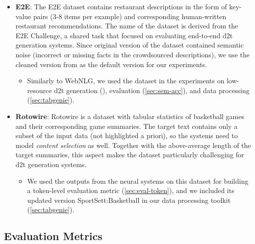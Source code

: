 {\begin{itemize}
    \item \textbf{E2E}: The E2E dataset \cite{dusekEvaluatingStateoftheartEndtoEnd2020} contains restaurant descriptions in the form of key-value pairs (3-8 items per example) and corresponding human-written restaurant recommendations. The name of the dataset is derived from the E2E Challenge, a shared task that focused on evaluating end-to-end \ac{d2t} generation systems. Since original version of the dataset contained semantic noise (incorrect or missing facts in the crowdsourced descriptions), we use the cleaned version from \citet{dusekSemanticNoiseMatters2019} as the default version for our experiments.
          \begin{itemize}
              \item
                    Similarly to WebNLG, we used the dataset in the experiments on low-resource \ac{d2t} generation (), evaluation (\autoref{sec:sem-acc}), and data processing (\autoref{sec:tabgenie}).
          \end{itemize}

    \item \textbf{Rotowire}: Rotowire \cite{wiseman2017challenges} is a dataset with tabular statistics of basketball games and their corresponding game summaries. The target text contains only a subset of the input data (not highlighted a priori), so the systems need to model \emph{content selection} as well. Together with the above-average length of the target summaries, this aspect makes the dataset particularly challenging for \ac{d2t} generation systems.
          \begin{itemize}
              \item
                    We used the outputs from the neural systems on this dataset for building a token-level evaluation metric (\autoref{sec:eval-token}), and we included its updated version SportSett:Basketball \cite{thomson2020sportsett} in our data processing toolkit (\autoref{sec:tabgenie}).
          \end{itemize}
\end{itemize}



\subsection{Evaluation Metrics}
\label{sec:evaluation}

}
